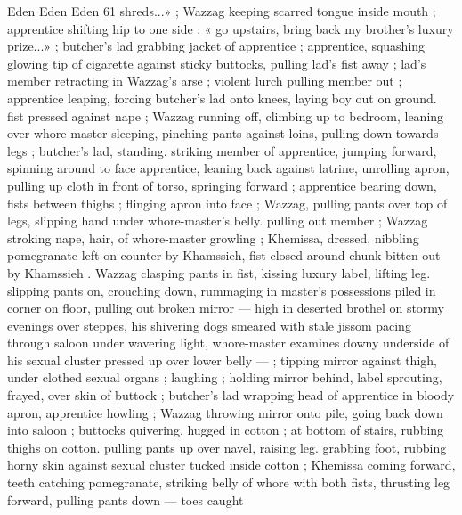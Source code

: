 Eden Eden Eden 61
shreds...» ; Wazzag keeping scarred tongue inside mouth ;
apprentice shifting hip to one side : « go upstairs, bring back my
brother's luxury prize...» ; butcher's lad grabbing jacket of
apprentice ; apprentice, squashing glowing tip of cigarette against
sticky buttocks, pulling lad’s fist away ; lad’s member retracting in
Wazzag's arse ; violent lurch pulling member out ; apprentice
leaping, forcing butcher's lad onto knees, laying boy out on ground.
fist pressed against nape ; Wazzag running off, climbing up to
bedroom, leaning over whore-master sleeping, pinching pants
against loins, pulling down towards legs ; butcher's lad, standing.
striking member of apprentice, jumping forward, spinning around to
face apprentice, leaning back against latrine, unrolling apron, pulling
up cloth in front of torso, springing forward ; apprentice bearing
down, fists between thighs ; flinging apron into face ; Wazzag, pulling
pants over top of legs, slipping hand under whore-master’s belly.
pulling out member ; Wazzag stroking nape, hair, of whore-master
growling ; Khemissa, dressed, nibbling pomegranate left on counter
by Khamssieh, fist closed around chunk bitten out by Khamssieh .
Wazzag clasping pants in fist, kissing luxury label, lifting leg. slipping
pants on, crouching down, rummaging in master's possessions piled
in corner on floor, pulling out broken mirror — high in deserted
brothel on stormy evenings over steppes, his shivering dogs
smeared with stale jissom pacing through saloon under wavering
light, whore-master examines downy underside of his sexual cluster
pressed up over lower belly — ; tipping mirror against thigh, under
clothed sexual organs ; laughing ; holding mirror behind, label
sprouting, frayed, over skin of buttock ; butcher's lad wrapping head
of apprentice in bloody apron, apprentice howling ; Wazzag throwing
mirror onto pile, going back down into saloon ; buttocks quivering.
hugged in cotton ; at bottom of stairs, rubbing thighs on cotton.
pulling pants up over navel, raising leg. grabbing foot, rubbing horny
skin against sexual cluster tucked inside cotton ; Khemissa coming
forward, teeth catching pomegranate, striking belly of whore with
both fists, thrusting leg forward, pulling pants down — toes caught

